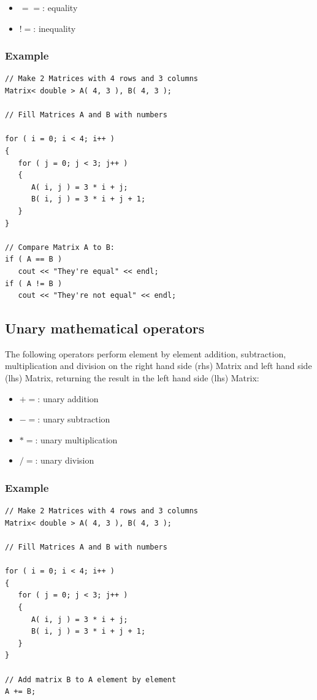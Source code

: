 \documentclass{report}
\begin{document}
\begin{itemize}
\item $==$: equality
\item $!=$: inequality
\end{itemize}

\subsubsection{Example}

\begin{verbatim}
// Make 2 Matrices with 4 rows and 3 columns
Matrix< double > A( 4, 3 ), B( 4, 3 );

// Fill Matrices A and B with numbers

for ( i = 0; i < 4; i++ )
{
   for ( j = 0; j < 3; j++ )
   {
      A( i, j ) = 3 * i + j;
      B( i, j ) = 3 * i + j + 1;
   }
}

// Compare Matrix A to B:
if ( A == B )
   cout << "They're equal" << endl;
if ( A != B )
   cout << "They're not equal" << endl;
\end{verbatim}

\subsection{Unary mathematical operators}

The following operators perform element by element addition,
subtraction, multiplication and division on the right hand side (rhs)
Matrix and left hand side (lhs) Matrix, returning the result in the
left hand side (lhs) Matrix:

\begin{itemize}
\item $+=$: unary addition
\item $-=$: unary subtraction
\item $*=$: unary multiplication
\item $/=$: unary division
\end{itemize}

\subsubsection{Example}

\begin{verbatim}
// Make 2 Matrices with 4 rows and 3 columns
Matrix< double > A( 4, 3 ), B( 4, 3 );

// Fill Matrices A and B with numbers

for ( i = 0; i < 4; i++ )
{
   for ( j = 0; j < 3; j++ )
   {
      A( i, j ) = 3 * i + j;
      B( i, j ) = 3 * i + j + 1;
   }
}

// Add matrix B to A element by element
A += B;
\end{verbatim}
\end{document}
